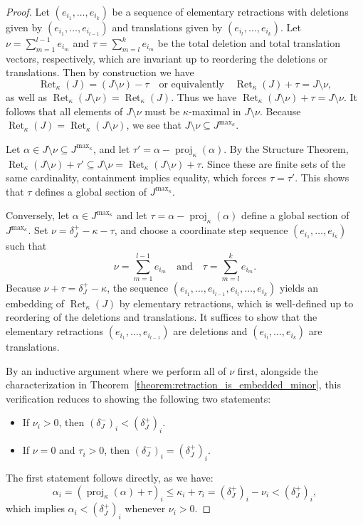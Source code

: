 \documentclass[10pt,a4paper]{amsart}
\newcommand{\delplus}{\delta_J^+}
\newcommand{\delminus}{\delta_J^-}
\DeclareMathOperator{\proj}{proj}              %
\newcommand{\kproj}{\proj_{\kappa}}            %
\DeclareMathOperator{\Ret}{Ret}                %
\newcommand{\RetK}{\Ret_{\kappa}}              %
\newcommand{\Jmax}{J^{\max_{\kappa}}}
\begin{document}
\begin{proof}
    Let $(e_{i_1}, \dots, e_{i_k})$ be a sequence of elementary retractions with deletions given by $(e_{i_1}, \dots, e_{i_{l-1}})$ and translations given by $(e_{i_l}, \dots, e_{i_k})$. Let $\nu = \sum_{m=1}^{l-1}e_{i_m}$ and $\tau = \sum_{m=l}^k e_{i_m}$ be the total deletion and total translation vectors, respectively, which are invariant up to reordering the deletions or translations. Then by construction we have 
    \[
    \RetK(J) = (J\setminus \nu)-\tau \quad \text{or equivalently} \quad \RetK(J) + \tau = J\setminus \nu,
    \]
    as well as $\RetK(J \setminus \nu) = \RetK(J)$. Thus we have $\RetK(J \setminus \nu) + \tau = J \setminus \nu$. It follows that all elements of $J \setminus \nu$ must be $\kappa$-maximal in $J \setminus \nu$. Because $\RetK(J) = \RetK(J \setminus \nu)$, we see that $J \setminus \nu \subseteq \Jmax$.
    
    Let $\alpha \in J \setminus \nu \subseteq \Jmax$, and let $\tau' = \alpha - \kproj(\alpha)$. By the Structure Theorem, $\RetK(J \setminus \nu) + \tau' \subseteq J \setminus \nu = \RetK(J\setminus \nu) + \tau$. Since these are finite sets of the same cardinality, containment implies equality, which forces $\tau = \tau'$. This shows that $\tau$ defines a global section of $\Jmax$. 

    \smallskip
    Conversely, let $\alpha \in \Jmax$ and let $\tau = \alpha - \kproj(\alpha)$ define a global section of $\Jmax$. Set $\nu = \delplus - \kappa - \tau$, and choose a coordinate step sequence $(e_{i_1}, \dots, e_{i_k})$ such that 
    \[
    \nu = \sum_{m = 1}^{l-1}e_{i_m} \quad \text{and}\quad \tau = \sum_{m = l}^k e_{i_m}.
    \]
    Because $\nu + \tau = \delplus - \kappa$, the sequence $(e_{i_1}, \dots, e_{i_{l-1}}, e_{i_l}, \dots, e_{i_k})$ yields an embedding of $\RetK(J)$ by elementary retractions, which is well-defined up to reordering of the deletions and translations. It suffices to show that the elementary retractions $(e_{i_1}, \dots, e_{i_{l-1}})$ are deletions and $(e_{i_l}, \dots, e_{i_k})$ are translations.

    By an inductive argument where we perform all of $\nu$ first, alongside the characterization in Theorem~\ref{theorem:retraction_is_embedded_minor}, this verification reduces to showing the following two statements:
    \begin{itemize}
        \item If $\nu_i > 0$, then $(\delminus)_i < (\delplus)_i$.
        \item If $\nu = 0$ and $\tau_i > 0$, then $(\delminus)_i = (\delplus)_i$.
    \end{itemize}
    The first statement follows directly, as we have: 
    \[
    \alpha_i = (\kproj(\alpha) + \tau)_i \leq \kappa_i + \tau_i = (\delplus)_i - \nu_i < (\delplus)_i,
    \]
    which implies $\alpha_i < (\delplus)_i$ whenever $\nu_i > 0$.


\end{proof}
\end{document}
